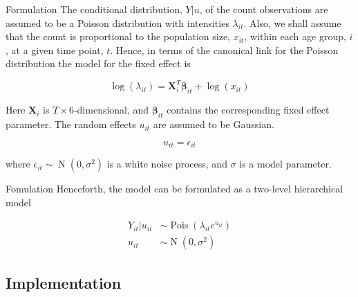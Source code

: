 \documentclass[aspectratio=169]{beamer}
\DeclareMathOperator{\N}{N}
\DeclareMathOperator{\Pois}{Pois}
\begin{document}
\begin{frame}{Formulation}
The conditional distribution, \(Y|u\), of the count observations are
assumed to be a Poisson distribution with intensities \(\lambda_{it}\).
Also, we shall assume that the count is proportional to the population
size, \(x_{it}\), within each age group, \(i\), at a given time point,
\(t\). Hence, in terms of the canonical link for the Poisson
distribution the model for the fixed effect is

\begin{equation}
  \log(\lambda_{it})=\mathbf{X}_i^T\mathbf{\beta}_{it}+\log(x_{it})
\end{equation}

Here \(\mathbf{X}_i\) is \(T\times6\)-dimensional, and
\(\mathbf{\beta}_{it}\) contains the corresponding fixed effect
parameter. The random effects \(u_{it}\) are assumed to be Gaussian.

\begin{equation}
  u_{it} = \epsilon_{it}
\end{equation}

where \(\epsilon_{it}\sim\N(0,\sigma^2)\) is a white noise process, and
\(\sigma\) is a model parameter.
\end{frame}

\begin{frame}{Fomulation}
\protect\hypertarget{fomulation}{}
Henceforth, the model can be formulated as a two-level hierarchical
model

\begin{subequations}
  \begin{alignat}{2}
    Y_{it}|u_{it} &\sim \Pois (\lambda_{it}e^{u_{it}}) \label{eq:pois_ln0} \\ 
    u_{it} &\sim \N(0,\sigma^2) \label{eq:pois_ln1}
  \end{alignat}
\end{subequations}
\end{frame}

\hypertarget{implementation}{%
\subsection{Implementation}\label{implementation}}
\end{document}

